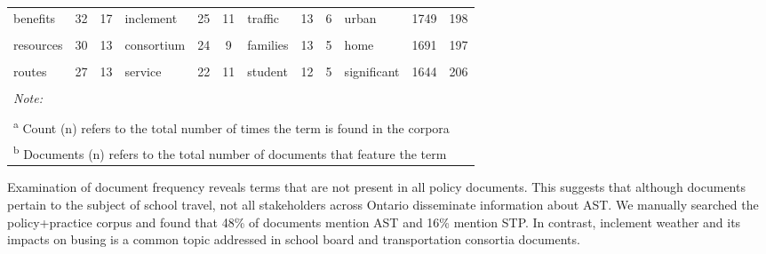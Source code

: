 \documentclass[preprint, 3p,
authoryear]{elsarticle} %
\begin{document}
\begin{table}
{\begin{tabular}[t]{lcclcclcclcc}
benefits & 32 & 17 & inclement & 25 & 11 & traffic & 13 & 6 & urban & 1749 & 198\\
\addlinespace
\cellcolor{gray!6}{play} & \cellcolor{gray!6}{31} & \cellcolor{gray!6}{2} & \cellcolor{gray!6}{eligibility} & \cellcolor{gray!6}{24} & \cellcolor{gray!6}{11} & \cellcolor{gray!6}{support} & \cellcolor{gray!6}{13} & \cellcolor{gray!6}{6} & \cellcolor{gray!6}{different} & \cellcolor{gray!6}{1695} & \cellcolor{gray!6}{213}\\
resources & 30 & 13 & consortium & 24 & 9 & families & 13 & 5 & home & 1691 & 197\\
\cellcolor{gray!6}{healthy} & \cellcolor{gray!6}{29} & \cellcolor{gray!6}{16} & \cellcolor{gray!6}{region} & \cellcolor{gray!6}{23} & \cellcolor{gray!6}{10} & \cellcolor{gray!6}{way} & \cellcolor{gray!6}{12} & \cellcolor{gray!6}{5} & \cellcolor{gray!6}{social} & \cellcolor{gray!6}{1672} & \cellcolor{gray!6}{189}\\
routes & 27 & 13 & service & 22 & 11 & student & 12 & 5 & significant & 1644 & 206\\
\cellcolor{gray!6}{lanes} & \cellcolor{gray!6}{26} & \cellcolor{gray!6}{3} & \cellcolor{gray!6}{•} & \cellcolor{gray!6}{21} & \cellcolor{gray!6}{1} & \cellcolor{gray!6}{region} & \cellcolor{gray!6}{12} & \cellcolor{gray!6}{4} & \cellcolor{gray!6}{mobility} & \cellcolor{gray!6}{1634} & \cellcolor{gray!6}{136}\\
\bottomrule
\multicolumn{12}{l}{\rule{0pt}{1em}\textit{Note: }}\\
\multicolumn{12}{l}{\rule{0pt}{1em} }\\
\multicolumn{12}{l}{\rule{0pt}{1em}\textsuperscript{a} Count (n) refers to the total number of times the term is found in the corpora}\\
\multicolumn{12}{l}{\rule{0pt}{1em}\textsuperscript{b} Documents (n) refers to the total number of documents that feature the term}\\
\end{tabular}}
\end{table}

Examination of document frequency reveals terms that are not present in
all policy documents. This suggests that although documents pertain to
the subject of school travel, not all stakeholders across Ontario
disseminate information about AST. We manually searched the
policy+practice corpus and found that 48\% of documents mention AST and
16\% mention STP. In contrast, inclement weather and its impacts on
busing is a common topic addressed in school board and transportation
consortia documents.
\end{document}
